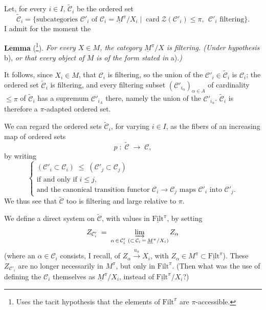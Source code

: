 
Let, for every $i\in I$, $\tilde{\mathcal{C}}_i$ be the ordered set
\[ \tilde{\mathcal{C}}_i = \{\text{subcategories } \mathcal{C}'_i \text{ of } \mathcal{C}_i = \underline{M}^\pi/X_i \mid \operatorname{card}\mathcal{Z}(\mathcal{C}'_i)\le\pi,\ \ \mathcal{C}'_i \text{ filtering}\}. \]
I admit for the moment the

\textbf{Lemma} (\footnote[44]{Uses the tacit hypothesis that the elements of $\mathrm{Filt}^\pi$ are $\pi$-accessible.}). \textit{For every $X\in M$, the category $\underline{M}^\pi/X$ is filtering. (Under hypothesis} b), \textit{or that every object of $M$ is of the form stated in} a).\textit{)}

It follows, since $X_i\in M$, that $\mathcal{C}_i$ is filtering, so the union of the $\mathcal{C}'_i\in\tilde{\mathcal{C}}_i$ is $\mathcal{C}_i$; the ordered set $\tilde{\mathcal{C}}_i$ is filtering, and every filtering subset $(\mathcal{C}'_{i_\alpha})_{\alpha\in A}$ of cardinality $\le\pi$ of $\tilde{\mathcal{C}}_i$ has a supremum $\mathcal{C}'_{i_A}$ there, namely the union of the $\mathcal{C}'_{i_\alpha}$. $\tilde{\mathcal{C}}_i$ is therefore a $\pi$-adapted ordered set.

We can regard the ordered sets $\tilde{\mathcal{C}}_i$, for varying $i\in I$, as the fibers of an increasing map of ordered sets
\[ p \;:\; \tilde{\mathcal{C}} \;\longrightarrow\; \mathcal{C}, \]
by writing
\[ \left\{ \begin{array}{l}
(\mathcal{C}'_i\subset\mathcal{C}_i) \;\le\; (\mathcal{C}'_j\subset\mathcal{C}_j) \\
\text{if and only if } i\le j, \\
\text{and the canonical transition functor } \mathcal{C}_i\longrightarrow\mathcal{C}_j \text{ maps } \mathcal{C}'_i \text{ into } \mathcal{C}'_j.
\end{array}\right. \]
We thus see that $\tilde{\mathcal{C}}$ too is filtering and large relative to $\pi$.

We define a direct system on $\tilde{\mathcal{C}}$, with values in $\underline{\mathrm{Filt}}^\pi$, by setting
\[ Z_{\mathcal{C}'_i} \;=\; \varinjlim_{\alpha\,\in\,\mathcal{C}'_i\ (\subset\,\mathcal{C}_i\,=\,\underline{M}^\pi/X_i)} Z_\alpha \]
(where an $\alpha\in\mathcal{C}_i$ consists, I recall, of $Z_\alpha\xrightarrow{u_\alpha}X_i$, with $Z_\alpha\in M^\pi\subset\underline{\mathrm{Filt}}^\pi$). These $Z_{\mathcal{C}'_i}$ are no longer necessarily in $M^\pi$, but only in $\mathrm{Filt}^\pi$. (Then what was the use of defining the $\mathcal{C}_i$ themselves as $\underline{M}^\pi/X_i$, instead of $\underline{\mathrm{Filt}}^\pi/X_i$?)

